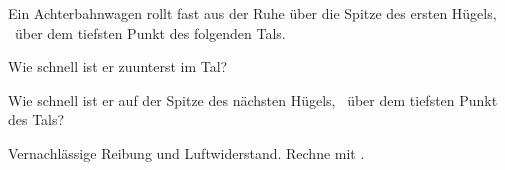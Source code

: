 Ein Achterbahnwagen rollt fast aus der Ruhe über die Spitze des ersten Hügels, \HhO\ über dem tiefsten Punkt des folgenden Tals.

\begin{abcliste}
\abc
Wie schnell ist er zuunterst im Tal?

\abc
Wie schnell ist er auf der Spitze des nächsten Hügels, \hzO\ über dem tiefsten Punkt des Tals?
\end{abcliste}

Vernachlässige Reibung und Luftwiderstand. Rechne mit \gO.
